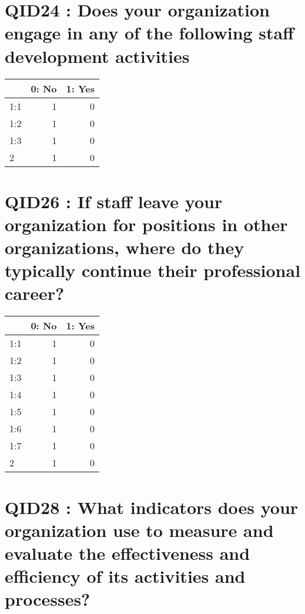 \documentclass[]{article}
\begin{document}
\section{QID24 : Does your organization engage in any of the following
staff development
activities}\label{qid24-does-your-organization-engage-in-any-of-the-following-staff-development-activities}

\begin{table}[H]
\centering\begingroup\fontsize{30}{32}\selectfont

\begin{tabular}{l|r|r}
\hline
  & 0: No &  1: Yes\\
\hline
1:1 & 1 & 0\\
\hline
1:2 & 1 & 0\\
\hline
1:3 & 1 & 0\\
\hline
2 & 1 & 0\\
\hline
\end{tabular}
\endgroup{}
\end{table}

\section{QID26 : If staff leave your organization for positions in other
organizations, where do they typically continue their professional
career?}\label{qid26-if-staff-leave-your-organization-for-positions-in-other-organizations-where-do-they-typically-continue-their-professional-career}

\begin{table}[H]
\centering\begingroup\fontsize{30}{32}\selectfont

\begin{tabular}{l|r|r}
\hline
  & 0: No &  1: Yes\\
\hline
1:1 & 1 & 0\\
\hline
1:2 & 1 & 0\\
\hline
1:3 & 1 & 0\\
\hline
1:4 & 1 & 0\\
\hline
1:5 & 1 & 0\\
\hline
1:6 & 1 & 0\\
\hline
1:7 & 1 & 0\\
\hline
2 & 1 & 0\\
\hline
\end{tabular}
\endgroup{}
\end{table}

\section{QID28 : What indicators does your organization use to measure
and evaluate the effectiveness and efficiency of its activities and
processes?}\label{qid28-what-indicators-does-your-organization-use-to-measure-and-evaluate-the-effectiveness-and-efficiency-of-its-activities-and-processes}
\end{document}
